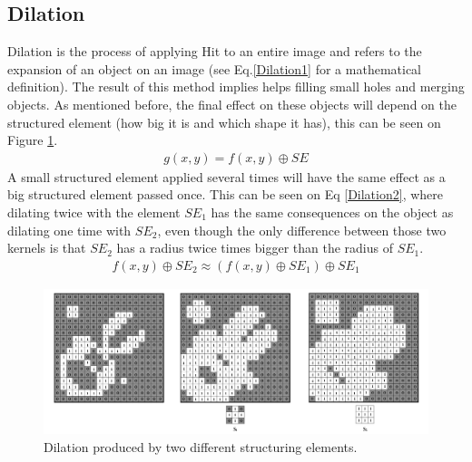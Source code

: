 \subsection{Dilation}
Dilation is the process of applying Hit to an entire image and refers to the expansion of an object on an image (see Eq.\ref{Dilation1} for a mathematical definition). The result of this method implies helps filling small holes and merging objects. As mentioned before, the final effect on these objects will depend on the structured element (how big it is and which shape it has), this can be seen on Figure \ref{fig:Dilation}. 
\begin{equation}
\begin{aligned}
{g(x, y)}={f(x,y)}\oplus{SE}
\label{Dilation1}
	\end{aligned}
\end{equation}
A small structured element applied several times will have the same effect as a big structured element passed once. This can be seen on Eq \ref{Dilation2}, where dilating twice with the element {$SE_{1}$} has the same consequences on the object as dilating one time with {$SE_{2}$}, even though the only difference between those two kernels is that {$SE_{2}$} has a radius twice times bigger than the radius of {$SE_{1}$}.
\begin{equation}
\begin{aligned}
{f(x,y)}\oplus{SE_{2}} \approx ({f(x,y)}\oplus{SE_{1}})\oplus{SE_{1}}
\label{Dilation2}
	\end{aligned}
\end{equation}
\begin{figure}[htbp]
\centering
\includegraphics[width=1\textwidth]{Pictures/Theory/Dilation.png}
\caption{Dilation produced by two different structuring elements.}
\label{fig:Dilation}
\end{figure}

